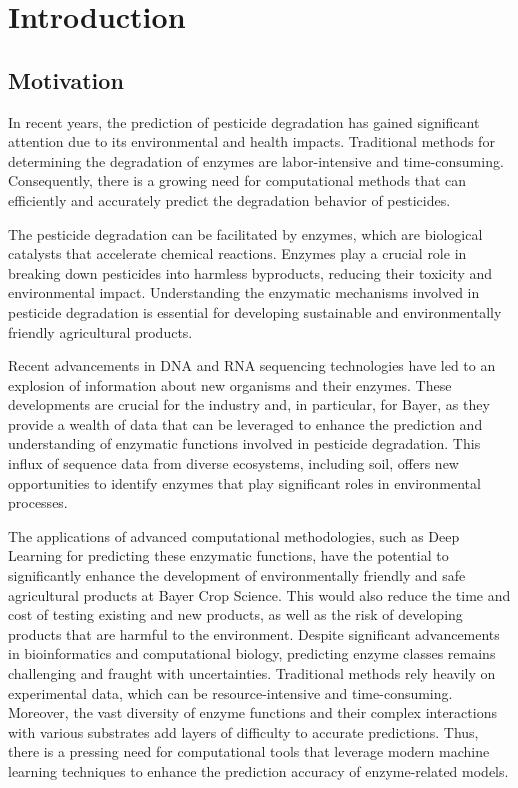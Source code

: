 \section{Introduction}

\subsection{Motivation}
\label{sec:Motivation}

In recent years, the prediction of pesticide degradation has gained significant attention due to its environmental and health impacts. Traditional methods for determining the degradation of enzymes are labor-intensive and time-consuming. Consequently, there is a growing need for computational methods that can efficiently and accurately predict the degradation behavior of pesticides.

The pesticide degradation can be facilitated by enzymes, which are biological catalysts that accelerate chemical reactions. Enzymes play a crucial role in breaking down pesticides into harmless byproducts, reducing their toxicity and environmental impact. Understanding the enzymatic mechanisms involved in pesticide degradation is essential for developing sustainable and environmentally friendly agricultural products.

Recent advancements in DNA and RNA sequencing technologies have led to an explosion of information about new organisms and their enzymes. These developments are crucial for the industry and, in particular, for Bayer, as they provide a wealth of data that can be leveraged to enhance the prediction and understanding of enzymatic functions involved in pesticide degradation. This influx of sequence data from diverse ecosystems, including soil, offers new opportunities to identify enzymes that play significant roles in environmental processes.

The applications of advanced computational methodologies, such as Deep Learning for predicting these enzymatic functions, have the potential to significantly enhance the development of environmentally friendly and safe agricultural products at Bayer Crop Science. This would also reduce the time and cost of testing existing and new products, as well as the risk of developing products that are harmful to the environment. Despite significant advancements in bioinformatics and computational biology, predicting enzyme classes remains challenging and fraught with uncertainties. Traditional methods rely heavily on experimental data, which can be resource-intensive and time-consuming. Moreover, the vast diversity of enzyme functions and their complex interactions with various substrates add layers of difficulty to accurate predictions. Thus, there is a pressing need for computational tools that leverage modern machine learning techniques to enhance the prediction accuracy of enzyme-related models.

